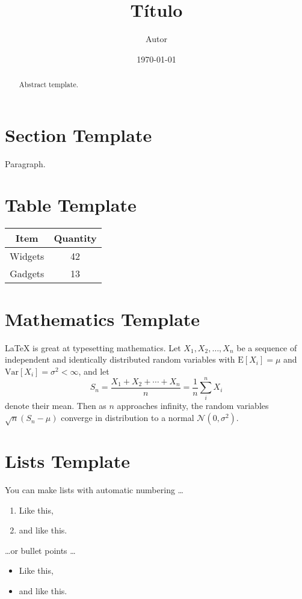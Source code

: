 \documentclass[a4paper,12pt,draft]{article}
\title{Título}
\author{Autor}
\date{\today}  %
\begin{document}
\maketitle
\tableofcontents

\begin{abstract}
Abstract template.
\end{abstract}

\section{Section Template}
Paragraph.

\section{Table Template}

\begin{center}
\begin{tabular}{|c|c|}
\hline
Item & Quantity \\
\hline
Widgets & 42 \\
\hline
Gadgets & 13 \\
\hline
\end{tabular}
\end{center}

\section{Mathematics Template}

\LaTeX{} is great at typesetting mathematics. Let $X_1, X_2, \ldots, X_n$ be a sequence of independent and identically distributed random variables with $\text{E}[X_i] = \mu$ and $\text{Var}[X_i] = \sigma^2 < \infty$, and let
$$S_n = \frac{X_1 + X_2 + \cdots + X_n}{n}
      = \frac{1}{n}\sum_{i}^{n} X_i$$
denote their mean. Then as $n$ approaches infinity, the random variables $\sqrt{n}(S_n - \mu)$ converge in distribution to a normal $\mathcal{N}(0, \sigma^2)$.


\section{Lists Template}

You can make lists with automatic numbering \dots

\begin{enumerate}
\item Like this,
\item and like this.
\end{enumerate}
\dots or bullet points \dots
\begin{itemize}
\item Like this,
\item and like this.
\end{itemize}
\end{document}
